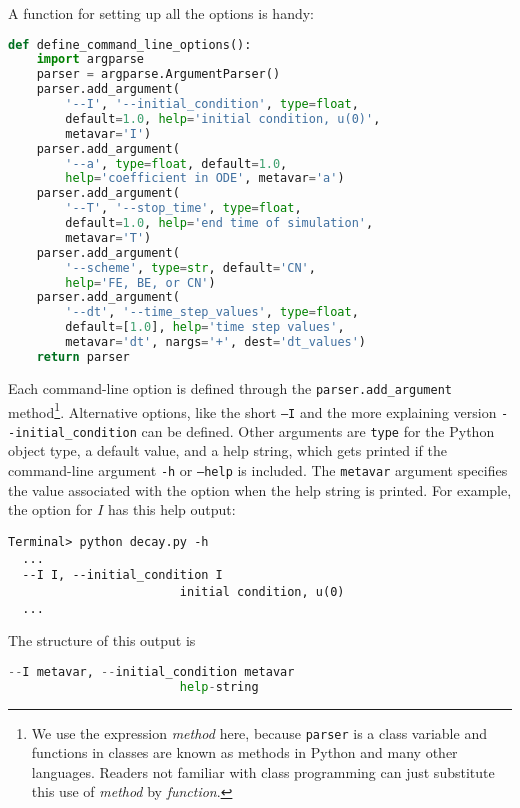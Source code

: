 \documentclass[graybox,sectrefs,envcountresetchap,open=right,final]{svmonodo}
\begin{document}
A function for setting up all the options is handy:

\begin{lstlisting}[language=Python,style=blue1_bluegreen]
def define_command_line_options():
    import argparse
    parser = argparse.ArgumentParser()
    parser.add_argument(
        '--I', '--initial_condition', type=float,
        default=1.0, help='initial condition, u(0)',
        metavar='I')
    parser.add_argument(
        '--a', type=float, default=1.0,
        help='coefficient in ODE', metavar='a')
    parser.add_argument(
        '--T', '--stop_time', type=float,
        default=1.0, help='end time of simulation',
        metavar='T')
    parser.add_argument(
        '--scheme', type=str, default='CN',
        help='FE, BE, or CN')
    parser.add_argument(
        '--dt', '--time_step_values', type=float,
        default=[1.0], help='time step values',
        metavar='dt', nargs='+', dest='dt_values')
    return parser
\end{lstlisting}

Each command-line option is defined through the \Verb!parser.add_argument!
method\footnote{We use the expression \emph{method} here, because \texttt{parser} is a class variable and functions in classes are known as methods in Python and many other languages. Readers not familiar with class programming can just substitute this use of \emph{method} by \emph{function}.}. Alternative options, like the short \texttt{--I} and the more
explaining version \Verb!--initial_condition! can be defined. Other arguments
are \texttt{type} for the Python object type, a default value, and a help
string, which gets printed if the command-line argument \texttt{-h} or \texttt{--help} is
included. The \texttt{metavar} argument specifies the value associated with
the option when the help string is printed. For example, the option for
$I$ has this help output:

\begin{Verbatim}[frame=lines,label=\fbox{{\tiny Terminal}},framesep=2.5mm,framerule=0.7pt,fontsize=\fontsize{9pt}{9pt}]
Terminal> python decay.py -h
  ...
  --I I, --initial_condition I
                        initial condition, u(0)
  ...
\end{Verbatim}
The structure of this output is

\begin{lstlisting}[language=Python,style=blue1_bluegreen]
  --I metavar, --initial_condition metavar
                        help-string
\end{lstlisting}
\end{document}
